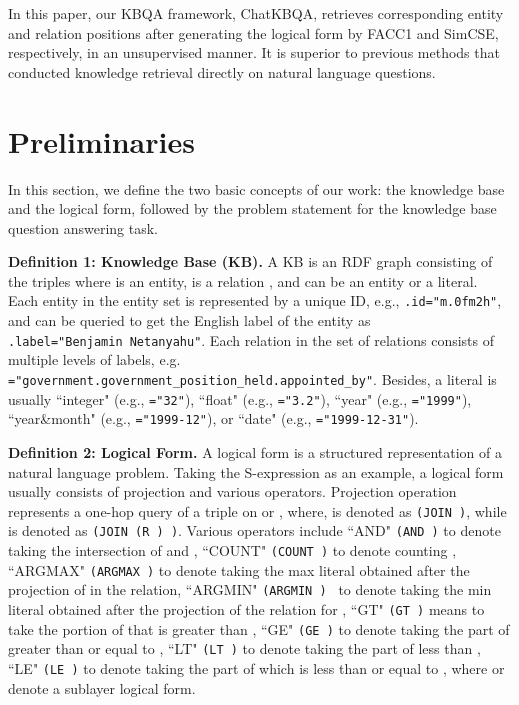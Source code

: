 \documentclass{article} \usepackage{iclr2024_conference,times}
\begin{document}
In this paper, our KBQA framework, ChatKBQA, retrieves corresponding entity and relation positions after generating the logical form by FACC1 and SimCSE, respectively, in an unsupervised manner. It is superior to previous methods that conducted knowledge retrieval directly on natural language questions.

\section{Preliminaries}

In this section, we define the two basic concepts of our work: the knowledge base and the logical form, followed by the problem statement for the knowledge base question answering task.

\textbf{Definition 1: Knowledge Base (KB).} A KB  is an RDF graph consisting of the triples  where  is an entity,  is a relation , and  can be an entity or a literal. Each entity  in the entity set  is represented by a unique ID, e.g., \texttt{.id="m.0fm2h"}, and can be queried to get the English label of the entity as \texttt{.label="Benjamin\ Netanyahu"}. Each relation  in the set of relations  consists of multiple levels of labels, e.g. \texttt{="government.government\_position\_held.appointed\_by"}. Besides, a literal  is usually ``integer" (e.g., \texttt{="32"}), ``float" (e.g., \texttt{="3.2"}), ``year" (e.g., \texttt{="1999"}), ``year\&month" (e.g., \texttt{="1999-12"}), or ``date" (e.g., \texttt{="1999-12-31"}).

\textbf{Definition 2: Logical Form. }A logical form is a structured representation of a natural language problem. Taking the S-expression as an example, a logical form usually consists of projection and various operators. Projection operation represents a one-hop query of a triple  on  or , where,  is denoted as \texttt{(JOIN  )}, while  is denoted as \texttt{(JOIN (R ) )}. Various operators include ``AND" \texttt{(AND  )} to denote taking the intersection of  and , ``COUNT" \texttt{(COUNT )} to denote counting , ``ARGMAX" \texttt{(ARGMAX  )} to denote taking the max literal obtained after the projection of  in the  relation, ``ARGMIN" \texttt{(ARGMIN  ) } to denote taking the min literal obtained after the projection of the  relation for , ``GT" \texttt{(GT  )} means to take the portion of  that is greater than , ``GE" \texttt {(GE  )} to denote taking the part of  greater than or equal to , ``LT" \texttt{(LT  )} to denote taking the part of  less than , ``LE" \texttt{(LE  )} to denote taking the part of  which is less than or equal to , where  or  denote a sublayer logical form.
\end{document}
